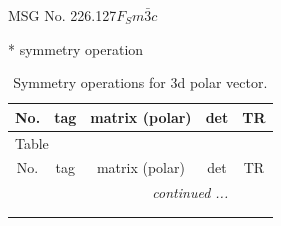 \documentclass[fleqn,8pt]{jsarticle}
\begin{document}
\setcounter{MaxMatrixCols}{32}

\renewcommand{\tablename}{Table~}
\renewcommand{\figurename}{Figure~}
\begin{center}
\LARGE
MSG No. 226.127\quad$F_{S}m\bar{3}c$
\end{center}
* symmetry operation
\renewcommand{\arraystretch}{1.3}
\begin{longtable}{ccccc}
\caption{Symmetry operations for 3d polar vector.}
 \\
 \hline \hline
No. & tag & matrix (polar) & det & TR \\ \hline \endfirsthead

\multicolumn{4}{l}{\tablename\ \thetable{}} \\
 \hline \hline
No. & tag & matrix (polar) & det & TR \\ \hline \endhead

 \hline \hline
\multicolumn{4}{r}{\footnotesize\it continued ...} \\ \endfoot

 \hline \hline
\multicolumn{4}{r}{} \\ \endlastfoot


\end{longtable}
\end{document}
